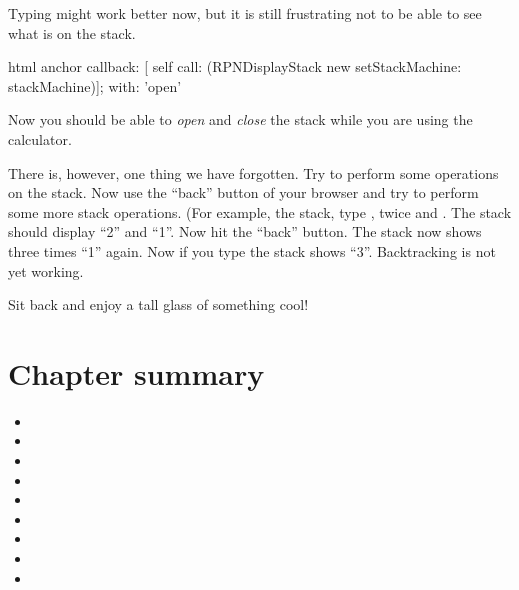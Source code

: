 \documentclass[a4paper,10pt,twoside]{book}
\begin{document}
Typing might work better now, but it is still frustrating not to be able to see what is on the stack.


\begin{code}{}
html anchor
	callback: [ self call: (RPNDisplayStack new setStackMachine: stackMachine)];
	with: 'open'
\end{code}


Now you should be able to \emph{open} and \emph{close} the stack while you are using the calculator.

There is, however, one thing we have forgotten.
Try to perform some operations on the stack.
Now use the ``back'' button of your browser and try to perform some more stack operations.
(For example,  the stack, type ,  twice and \menu {+}.
The stack should display ``2'' and ``1''.
Now hit the ``back'' button.
The stack now shows three times ``1'' again.
Now if you type \menu{+} the stack shows ``3''.
Backtracking is not yet working.


Sit back and enjoy a tall glass of something cool!

\section{Chapter summary}


\begin{itemize}
  \item 
  \item 
  \item 
  \item 
  \item 
  \item 
  \item 
  \item 
  \item 
\end{itemize}


\ifx\wholebook\relax\else 
   
   
\end{document}
